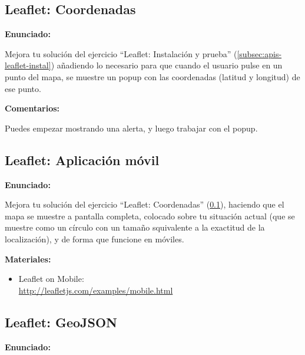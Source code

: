 \subsection{Leaflet: Coordenadas}
\label{subsec:apis-leaflet-coordenadas}

\textbf{Enunciado:}

Mejora tu solución del ejercicio ``Leaflet: Instalación y prueba'' (\ref{subsec:apis-leaflet-instal}) añadiendo lo necesario para que cuando el usuario pulse en un punto del mapa, se muestre un popup con las coordenadas (latitud y longitud) de ese punto.

\textbf{Comentarios:}

Puedes empezar mostrando una alerta, y luego trabajar con el popup.

\subsection{Leaflet: Aplicación móvil}
\label{subsec:apis-leaflet-movil}

\textbf{Enunciado:}

Mejora tu solución del ejercicio ``Leaflet: Coordenadas'' (\ref{subsec:apis-leaflet-coordenadas}), haciendo que el mapa se muestre a pantalla completa, colocado sobre tu situación actual (que se muestre como un círculo con un tamaño squivalente a la exactitud de la localización), y de forma que funcione en móviles.

\textbf{Materiales:}

\begin{itemize}
\item Leaflet on Mobile: \\
  \url{http://leafletjs.com/examples/mobile.html}
\end{itemize}

\subsection{Leaflet: GeoJSON}
\label{subsec:apis-leaflet-geojson}

\textbf{Enunciado:}

